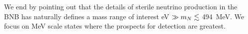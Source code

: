 \documentclass[11pt, a4paper]{article}
\def\ster{\ensuremath N}
\begin{document}
%
%

We end by pointing out that the details of sterile neutrino production in the
BNB has naturally defines a mass range of interest eV $\gg m_\ster \lesssim$
494~MeV. We focus on MeV scale states where the prospects for detection are
greatest.
\end{document}
